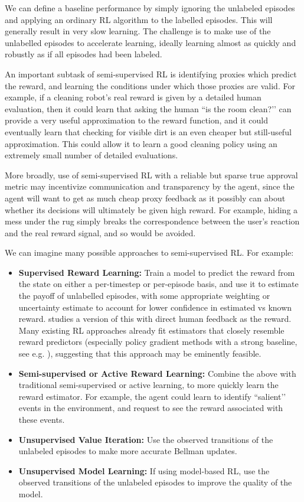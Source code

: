 \documentclass[a4paper,10pt]{article}
\begin{document}
We can define a baseline performance by simply ignoring the unlabeled episodes and applying an ordinary RL algorithm to the labelled episodes.  This will generally result in very slow learning.  The challenge is to make use of the unlabelled episodes to accelerate learning, ideally learning almost as quickly and robustly as if all episodes had been labeled.  

An important subtask of semi-supervised RL is identifying proxies which predict the reward, and learning the conditions under which those proxies are valid. For example, if a cleaning robot’s real reward is given by a detailed human evaluation, then it could learn that asking the human ``is the room clean?’’ can provide a very useful approximation to the reward function, and it could eventually learn that checking for visible dirt is an even cheaper but still-useful approximation. This could allow it to learn a good cleaning policy using an extremely small number of detailed evaluations.

More broadly, use of semi-supervised RL with a reliable but sparse true approval metric may incentivize communication and transparency by the agent, since the agent will want to get as much cheap proxy feedback as it possibly can about whether its decisions will ultimately be given high reward. For example, hiding a mess under the rug simply breaks the correspondence between the user’s reaction and the real reward signal, and so would be avoided.

We can imagine many possible approaches to semi-supervised RL. For example:

\begin{itemize}
\item {\bf Supervised Reward Learning:} Train a model to predict the reward from the state on either a per-timestep or per-episode basis, and use it to estimate the payoff of unlabelled episodes, with some appropriate weighting or uncertainty estimate to account for lower confidence in estimated vs known reward. \cite{daniel2014active} studies a version of this with direct human feedback as the reward. Many existing RL approaches already fit estimators that closely resemble reward predictors (especially policy gradient methods with a strong baseline, see e.g. \cite{schulman2015high}), suggesting that this approach may be eminently feasible.
\item {\bf Semi-supervised or Active Reward Learning:} Combine the above with traditional semi-supervised or active learning, to more quickly learn the reward estimator. For example, the agent could learn to identify ``salient’’ events in the environment, and request to see the reward associated with these events.
\item {\bf Unsupervised Value Iteration:} Use the observed transitions of the unlabeled episodes to make more accurate Bellman updates.
\item {\bf Unsupervised Model Learning:} If using model-based RL, use the observed transitions of the unlabeled episodes to improve the quality of the model.
\end{itemize}
\end{document}

